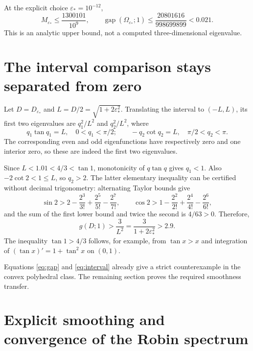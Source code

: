 \documentclass[11pt,a4paper]{article}
\theoremstyle{remark}
\newcommand{\eps}{\varepsilon}
\newcommand{\gap}{\operatorname{gap}}
\begin{document}
At the explicit choice $\eps_*=10^{-12}$,
\[
 M_{\eps_*}\le\frac{1300101}{10^9},\qquad
 \gap(\Omega_{\eps_*};1)
 \le\frac{20801616}{998699899}<0.021.
\]
This is an analytic upper bound, not a computed three-dimensional eigenvalue.

\section{The interval comparison stays separated from zero}
Let $D=D_{\eps_*}$ and $L=D/2=\sqrt{1+2\eps_*^2}$. Translating the interval to $(-L,L)$, its first two eigenvalues are $q_1^2/L^2$ and $q_2^2/L^2$, where
\[
 q_1\tan q_1=L,\quad 0<q_1<\pi/2;\qquad
 -q_2\cot q_2=L,\quad \pi/2<q_2<\pi.
\]
The corresponding even and odd eigenfunctions have respectively zero and one interior zero, so these are indeed the first two eigenvalues.

Since $L<1.01<4/3<\tan1$, monotonicity of $q\tan q$ gives $q_1<1$. Also $-2\cot2<1\le L$, so $q_2>2$. The latter elementary inequality can be certified without decimal trigonometry: alternating Taylor bounds give
\[
 \sin2>2-\frac{2^3}{3!}+\frac{2^5}{5!}-\frac{2^7}{7!},\qquad
 \cos2>1-\frac{2^2}{2!}+\frac{2^4}{4!}-\frac{2^6}{6!},
\]
and the sum of the first lower bound and twice the second is $4/63>0$. Therefore,
\begin{equation}\label{eq:interval}
 g(D;1)>\frac3{L^2}=\frac3{1+2\eps_*^2}>2.9.
\end{equation}
The inequality $\tan1>4/3$ follows, for example, from $\tan x>x$ and integration of $(\tan x)'=1+\tan^2x$ on $(0,1)$.

Equations \eqref{eq:gap} and \eqref{eq:interval} already give a strict counterexample in the convex polyhedral class. The remaining section proves the required smoothness transfer.

\section{Explicit smoothing and convergence of the Robin spectrum}\label{sec:smoothing}
\end{document}

